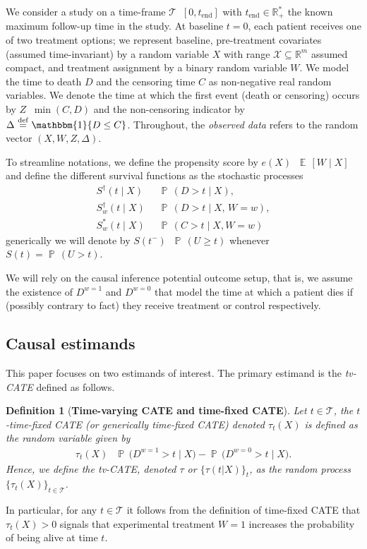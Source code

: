 \documentclass{article}
\newtheorem{definition}{Definition}
\DeclareMathOperator*{\eqdef }{\,\stackrel{\text{def}}{=}\,}
\DeclareMathOperator{\IDF}{\mathbbm{1}}%
\DeclareMathOperator{\EX}{\mathbb{E}\,}
\DeclareMathOperator{\PR}{\mathbb{P}\,}
\newcommand{\tend}{t_{\mathrm{end}}}
\newcommand{\R}{\mathbb{R}}
\begin{document}
\bigskip 

We consider a study on a time-frame $\mathcal{T} \eqdef [0,\tend]$ with $\tend \in \R^*_+$ the known maximum follow-up time in the study. 
At baseline $t=0$, each patient receives one of two treatment options; we represent baseline, pre-treatment covariates (assumed time-invariant) by a random variable $X$ with range $\mathcal{X} \subseteq \R^m$ assumed compact, and treatment assignment by a binary random variable $W$. We model the time to death $D$ and the censoring time $C$ as non-negative real random variables. We denote the time at which the first event (death or censoring) occurs by $Z \eqdef \min(C,D)$ and the non-censoring indicator by $\Delta \eqdef \IDF\{D \leq C\}$.
Throughout, the \emph{observed data} refers to the random vector $(X,W,Z,\Delta)$.


To streamline notations, we define the propensity score by $e(X) \eqdef \EX[W \mid X]$ and define the different survival functions as the stochastic processes
\begin{align*}
    S^\dag(t\mid X) \eqdef& \PR(D>t \mid X), \\
    S^\dag_w(t\mid X) \eqdef& \PR(D>t \mid X,\,W=w), \\
    S^*_w(t \mid X)\eqdef& \PR(C>t \mid X,W=w)
\end{align*}
generically we will denote by $S(t^-) \eqdef \PR(U \geq t)$ whenever $S(t) = \PR(U > t)$.


We will rely on the causal inference potential outcome setup, that is, we assume the existence of $D^{w=1}$ and $D^{w=0}$ that model the time at which a patient dies if (possibly contrary to fact) they receive treatment or control respectively. 

\subsection*{Causal estimands}
This paper focuses on two estimands of interest. The primary estimand is the \emph{tv-CATE} defined as follows.

\begin{definition}[{\bf Time-varying CATE and time-fixed CATE}]\label{def:t-CATE}
Let $t \in \mathcal{T}$, the $t$-time-fixed CATE (or generically time-fixed CATE) denoted $\tau_t(X)$ is defined as the random variable given by
\begin{align*}
\tau_t(X) \eqdef \, \PR \bigl(D^{w=1}>t \mid X\bigr)-\PR \bigl(D^{w=0}>t \mid X\bigr).
\end{align*}
Hence, we define the \emph{tv-CATE}, denoted $\tau$ or $\{\tau(t|X)\}_t$, as the random process $\{\tau_t(X)\}_{t \in \mathcal{T}}$.
\end{definition}
In particular, for any $t \in \mathcal{T}$ it follows from the definition of time-fixed CATE that $\tau_t(X)> 0$ signals that experimental treatment $W=1$ increases the probability of being alive at time $t$.
\end{document}
